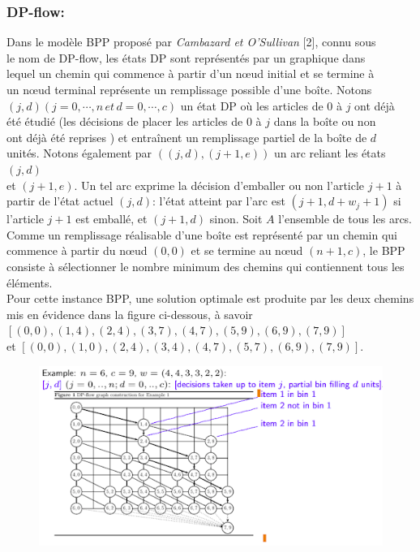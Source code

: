 \documentclass[class=report, crop=false]{standalone}
\begin{document}
        \subsubsection*{DP-flow:}
        Dans le modèle BPP proposé par \emph{Cambazard et O’Sullivan} [2], connu sous\\
        le nom de DP-flow, les états DP sont représentés par un graphique dans \\
        lequel un chemin qui commence à partir d'un nœud initial et se termine à \\ 
        un nœud terminal représente un remplissage possible d'une boîte. Notons \\
        \((j, d) (j = 0, \cdots, n \, et \, d = 0, \cdots, c)\) un état DP où les articles de \(0\) à \(j\) ont déjà \\
        été étudié (les décisions de placer les articles de \(0\) à \(j\) dans la boîte ou non\\
        ont déjà été reprises ) et entraînent un remplissage partiel de la boîte de \(d\) \\
        unités. Notons également par \(((j, d), (j + 1, e))\) un arc reliant les états \((j, d)\) \\
        et \((j + 1, e)\). Un tel arc exprime la décision d'emballer ou non l'article \(j + 1\) à partir de l'état actuel \((j, d)\): l'état atteint par l'arc est \((j + 1, d + w_j + 1)\) si l'article \(j + 1\) est emballé, et \((j + 1, d)\) sinon.
        Soit \(A\) l'ensemble de tous les arcs. Comme un remplissage réalisable d’une boîte est représenté par un chemin qui commence à partir du nœud \((0, 0)\) et se termine au nœud \((n + 1, c)\), le BPP consiste à sélectionner le nombre minimum des chemins qui contiennent tous les éléments. \\
        Pour cette instance BPP, une solution optimale est produite par les deux chemins mis en évidence dans la figure ci-dessous, à savoir \\\([(0,0), (1,4), (2,4), (3,7), (4,7), (5,9), (6,9), (7,9)]\) \\
        et \([(0,0), (1,0), (2,4), (3,4), (4,7), (5,7), (6,9), (7,9)]\).
        \begin{figure}[h!]
            \includegraphics[width=13.5cm]{../figures/DP-flow.png}
        \end{figure}
\end{document}
